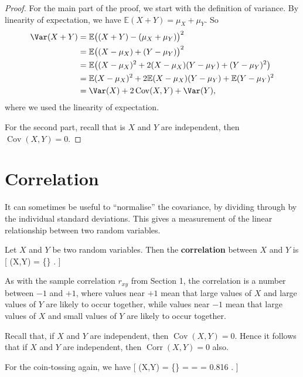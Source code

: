 \documentclass[
  letterpaper,
  DIV=11,
  numbers=noendperiod]{scrreprt}
\theoremstyle{remark}
\begin{document}
\begin{proof}

For the main part of the proof, we start with the definition of
variance. By linearity of expectation, we have
\(\mathbb E(X + Y) = \mu_X + \mu_Y\). So \begin{align*}
\Var(X + Y) &= \mathbb E\big((X + Y) - (\mu_X + \mu_Y)\big)^2 \\
  &= \mathbb E \big((X - \mu_X) + (Y - \mu_Y) \big)^2 \\
  &= \mathbb E \big( (X - \mu_X)^2 + 2(X - \mu_X)(Y - \mu_Y) + (Y - \mu_Y)^2\big) \\
  &= \mathbb E(X - \mu_X)^2 + 2 \mathbb E(X - \mu_X)(Y - \mu_Y) + \mathbb E (Y - \mu_Y)^2 \\
  &= \Var(X) + 2\operatorname{Cov}(X,Y) + \Var(Y) ,
\end{align*} where we used the linearity of expectation.

For the second part, recall that is \(X\) and \(Y\) are independent,
then \(\operatorname{Cov}(X,Y) = 0\).

\end{proof}

\hypertarget{correlation}{%
\section{Correlation}\label{correlation}}

It can sometimes be useful to ``normalise'' the covariance, by dividing
through by the individual standard deviations. This gives a measurement
of the linear relationship between two random variables.

Let \(X\) and \(Y\) be two random variables. Then the
\textbf{correlation} between \(X\) and \(Y\) is {[}
(X,Y) = 
\{\} . {]}

As with the sample correlation \(r_{xy}\) from Section 1, the
correlation is a number between \(-1\) and \(+1\), where values near
\(+1\) mean that large values of \(X\) and large values of \(Y\) are
likely to occur together, while values near \(-1\) mean that large
values of \(X\) and small values of \(Y\) are likely to occur together.

Recall that, if \(X\) and \(Y\) are independent, then
\(\operatorname{Cov}(X,Y) = 0\). Hence it follows that if \(X\) and
\(Y\) are independent, then \(\operatorname{Corr}(X,Y) = 0\) also.

For the coin-tossing again, we have {[} (X,Y) =
 \{\} =
 =  = 0.816
. {]}
\end{document}
